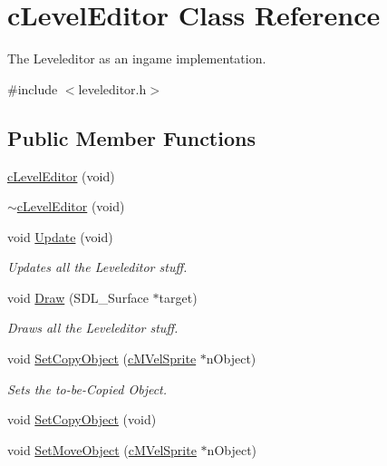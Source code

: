 \hypertarget{classc_level_editor}{\section{c\-Level\-Editor Class Reference}
\label{classc_level_editor}
}


The Leveleditor as an ingame implementation.  




{\ttfamily \#include $<$leveleditor.\-h$>$}

\subsection*{Public Member Functions}
\begin{DoxyCompactItemize}
\item 
\hyperlink{classc_level_editor_addc4fb83347d2a935b78eb16d30f97f2}{c\-Level\-Editor} (void)
\item 
\hyperlink{classc_level_editor_aff38f4eeb499e96c78680dc39edc134c}{$\sim$c\-Level\-Editor} (void)
\item 
void \hyperlink{classc_level_editor_a192c252bae357b298efe232699870685}{Update} (void)
\begin{DoxyCompactList}\small\item\em Updates all the Leveleditor stuff. \end{DoxyCompactList}\item 
void \hyperlink{classc_level_editor_a61119f6cee05264c01331db43115d2ea}{Draw} (S\-D\-L\-\_\-\-Surface $\ast$target)
\begin{DoxyCompactList}\small\item\em Draws all the Leveleditor stuff. \end{DoxyCompactList}\item 
void \hyperlink{classc_level_editor_a5875209655ccbf991c242edc02d499d6}{Set\-Copy\-Object} (\hyperlink{classc_m_vel_sprite}{c\-M\-Vel\-Sprite} $\ast$n\-Object)
\begin{DoxyCompactList}\small\item\em Sets the to-\/be-\/\-Copied Object. \end{DoxyCompactList}\item 
void \hyperlink{classc_level_editor_a3310ba8fa64c341c8db9007d20c61628}{Set\-Copy\-Object} (void)
\item 
void \hyperlink{classc_level_editor_a74b61cee3ddf94ebbf6b92fc3ef5769b}{Set\-Move\-Object} (\hyperlink{classc_m_vel_sprite}{c\-M\-Vel\-Sprite} $\ast$n\-Object)

\end{DoxyCompactItemize}
